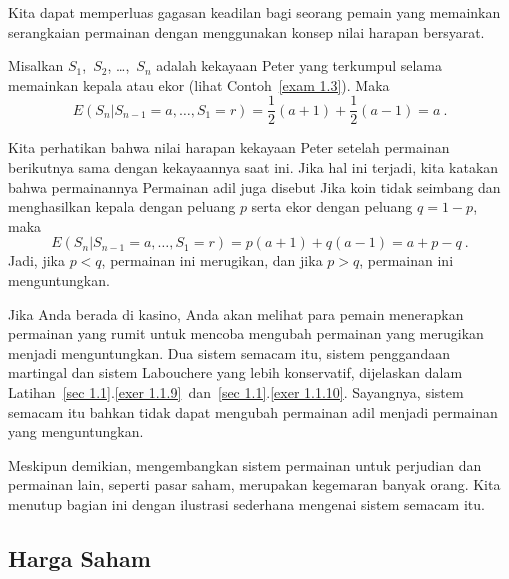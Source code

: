 Kita dapat memperluas gagasan keadilan bagi seorang pemain yang memainkan serangkaian
permainan dengan menggunakan konsep nilai harapan bersyarat.

\begin{example}\label{exam 6.11} Misalkan $S_1$,~$S_2$, \dots,~$S_n$ adalah kekayaan
Peter yang terkumpul selama memainkan kepala atau ekor (lihat
Contoh~\ref{exam 1.3}). Maka
$$ E(S_n | S_{n - 1} = a,\dots,S_1 = r) = \frac 12 (a + 1) + \frac 12 (a - 1) = a\ .
$$

Kita perhatikan bahwa nilai harapan kekayaan Peter setelah permainan berikutnya sama
dengan kekayaannya saat ini. Jika hal ini terjadi, kita katakan bahwa permainannya
 Permainan adil juga disebut
 Jika koin tidak seimbang dan menghasilkan kepala
dengan peluang $p$ serta ekor dengan peluang $q = 1 - p$, maka
$$ E(S_n | S_{n - 1} = a,\dots,S_1 = r) = p (a + 1) + q (a - 1) = a + p - q\ .
$$ Jadi, jika $p < q$, permainan ini merugikan, dan jika $p > q$, permainan ini
menguntungkan.
\end{example}

Jika Anda berada di kasino, Anda akan melihat para pemain menerapkan 
permainan yang rumit untuk mencoba mengubah permainan yang
merugikan menjadi menguntungkan. Dua sistem semacam itu, sistem penggandaan martingal
dan sistem Labouchere yang lebih konservatif, dijelaskan dalam
Latihan~\ref{sec 1.1}.\ref{exer 1.1.9}~dan~\ref{sec 1.1}.\ref{exer 1.1.10}.
Sayangnya, sistem semacam itu bahkan tidak dapat mengubah permainan adil menjadi
permainan yang menguntungkan.

Meskipun demikian, mengembangkan sistem permainan untuk perjudian dan permainan lain,
seperti pasar saham, merupakan kegemaran banyak orang. Kita menutup bagian ini dengan
ilustrasi sederhana mengenai sistem semacam itu.

\subsection*{Harga Saham}

